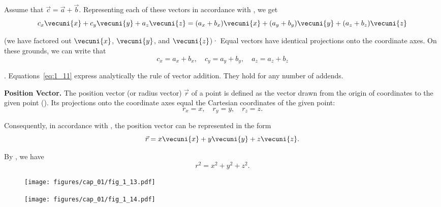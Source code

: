 Assume that $\vec{c}=\vec{a}+\vec{b}$. Representing each of these vectors in accordance with , we get
\begin{equation*}
c_x\vecuni{x} + c_y\vecuni{y} + a_z\vecuni{z} = (a_x+b_x)\vecuni{x} + (a_y+b_y)\vecuni{y} + (a_z+b_z)\vecuni{z}
\end{equation*}

\noindent
(we have factored out $\vecuni{x}$, $\vecuni{y}$, and $\vecuni{z}$)· Equal vectors have identical projections onto the coordinate axes. On these grounds, we can write that
\begin{equation}\label{eq:1_11}
c_x=a_x+b_x,\quad c_y=a_y+b_y,\quad a_z=a_z+b_z
\end{equation}

. Equations~\eqref{eq:1_11} express analytically the rule of vector addition. They hold for any number of addends.

\textbf{Position Vector.} The position vector (or radius vector) $\vec{r}$ of a point is defined as the vector drawn from the origin of coordinates to the given point (). Its projections onto the coordinate axes equal the Cartesian coordinates of the given point:
\begin{equation}\label{eq:1_12}
r_x=x,\quad r_y=y,\quad r_z=z.
\end{equation}

\noindent
Consequently, in accordance with , the position vector can be represented in the form
\begin{equation}\label{eq:1_13}
\vec{r} = x\vecuni{x} + y\vecuni{y} + z\vecuni{z}.
\end{equation}

\noindent
By , we have
\begin{equation}\label{eq:1_14}
r^2 = x^2 + y^2 + z^2.
\end{equation}

\begin{figure}[t]
	\begin{minipage}[t]{0.5\linewidth}
		\begin{center}
			\texttt{[image: figures/cap\_01/fig\_1\_13.pdf]}
			\caption[]{}
			\label{fig:1_13}
		\end{center}
	\end{minipage}
	\hfill{ }%
	\begin{minipage}[t]{0.5\linewidth}
		\begin{center}
			\texttt{[image: figures/cap\_01/fig\_1\_14.pdf]}
			\caption[]{}
			\label{fig:1_14}
		\end{center}
	\end{minipage}
\vspace{-0.3cm}
\end{figure}


